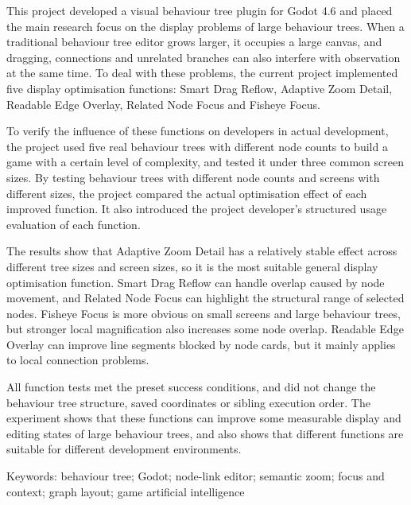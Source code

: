 
This project developed a visual behaviour tree plugin for Godot 4.6 and placed the main research focus on the display problems of large behaviour trees. When a traditional behaviour tree editor grows larger, it occupies a large canvas, and dragging, connections and unrelated branches can also interfere with observation at the same time. To deal with these problems, the current project implemented five display optimisation functions: Smart Drag Reflow, Adaptive Zoom Detail, Readable Edge Overlay, Related Node Focus and Fisheye Focus.

To verify the influence of these functions on developers in actual development, the project used five real behaviour trees with different node counts to build a game with a certain level of complexity, and tested it under three common screen sizes. By testing behaviour trees with different node counts and screens with different sizes, the project compared the actual optimisation effect of each improved function. It also introduced the project developer's structured usage evaluation of each function.

The results show that Adaptive Zoom Detail has a relatively stable effect across different tree sizes and screen sizes, so it is the most suitable general display optimisation function. Smart Drag Reflow can handle overlap caused by node movement, and Related Node Focus can highlight the structural range of selected nodes. Fisheye Focus is more obvious on small screens and large behaviour trees, but stronger local magnification also increases some node overlap. Readable Edge Overlay can improve line segments blocked by node cards, but it mainly applies to local connection problems.

All function tests met the preset success conditions, and did not change the behaviour tree structure, saved coordinates or sibling execution order. The experiment shows that these functions can improve some measurable display and editing states of large behaviour trees, and also shows that different functions are suitable for different development environments.

Keywords: behaviour tree; Godot; node-link editor; semantic zoom; focus and context; graph layout; game artificial intelligence

